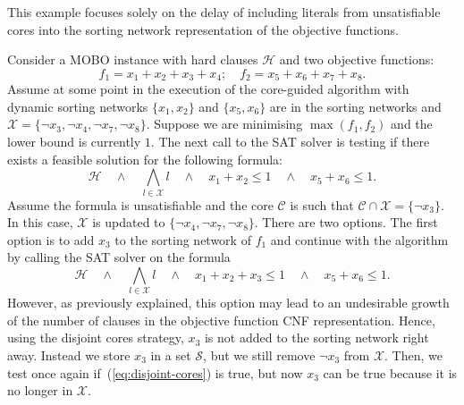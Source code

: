 \documentclass[a4paper,UKenglish,cleveref, autoref, thm-restate]{lipics-v2021}
\begin{document}
\begin{example}\label{eg:disjoint}
This example focuses solely on the delay of including literals from unsatisfiable cores into the sorting network representation of the objective functions.

Consider a MOBO instance with hard clauses $\mathcal{H}$ and two objective functions:
\begin{equation*}
    f_1 = x_1 + x_2 + x_3 + x_4; \quad f_2 = x_5 + x_6 + x_7 + x_8.
\end{equation*}
Assume at some point in the execution of the core-guided algorithm with dynamic sorting networks $\{x_1,x_2\}$ and $\{x_5,x_6\}$ are in the sorting networks and $\mathcal{X}=\{\neg x_3,\neg x_4,\neg x_7,\neg x_8\}$.
Suppose we are minimising $\max(f_1,f_2)$ and the lower bound is currently $1$.
The next call to the SAT solver is testing if there exists a feasible solution 
for the following formula:
\begin{equation}
    \mathcal{H} \quad \wedge \quad \bigwedge_{l \in \mathcal{X}} l \quad \wedge \quad x_1 + x_2 \leq 1 \quad \wedge \quad x_5 + x_6 \leq 1.\label{eq:disjoint-cores}
\end{equation}
Assume the formula is unsatisfiable and the core $\mathcal{C}$ is such that $\mathcal{C}\cap \mathcal{X}=\{\neg x_3\}$.
In this case, $\mathcal{X}$ is updated to $\{\neg x_4,\neg x_7,\neg x_8\}$.
There are two options.
The first option is to add $x_3$ to the sorting network of $f_1$ and continue with the algorithm by calling the SAT solver on the formula
\begin{equation}
    \mathcal{H} \quad \wedge \quad \bigwedge_{l \in \mathcal{X}} l \quad \wedge \quad x_1 + x_2 + x_3 \leq 1 \quad \wedge \quad x_5 + x_6 \leq 1.\label{eq:disjoint-cores2}
\end{equation}
However, as previously explained, this option may lead to an undesirable growth of the number of clauses in the objective function CNF representation.
Hence, using the disjoint cores strategy, $x_3$ is not added to the sorting network right away.
Instead we store $x_3$ in a set $\mathcal{S}$, but we still remove $\neg x_3$ from $\mathcal{X}$.
Then, we test once again if~(\ref{eq:disjoint-cores}) is true, but now $x_3$ can be true because it is no longer in $\mathcal{X}$.


\end{example}
\end{document}
